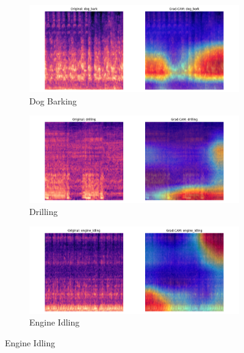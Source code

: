 \documentclass[11pt]{article}
\begin{document}
\begin{figure}[ht]
    \begin{subfigure}[b]{0.24\textwidth}
        \centering
        \includegraphics[width=\textwidth]{latex/assets/efficientnet_fold7_gradcam/gradcam_dog_bark_0.png}
        \caption{Dog Barking}
    \end{subfigure}
    \hfill
    \begin{subfigure}[b]{0.24\textwidth}
        \centering
        \includegraphics[width=\textwidth]{latex/assets/efficientnet_fold7_gradcam/gradcam_drilling_0.png}
        \caption{Drilling}
    \end{subfigure}
    \hfill
    \begin{subfigure}[b]{0.24\textwidth}
        \centering
        \includegraphics[width=\textwidth]{latex/assets/efficientnet_fold7_gradcam/gradcam_engine_idling_0.png}
        \caption{Engine Idling}
    \end{subfigure}

\end{figure}
\end{document}
